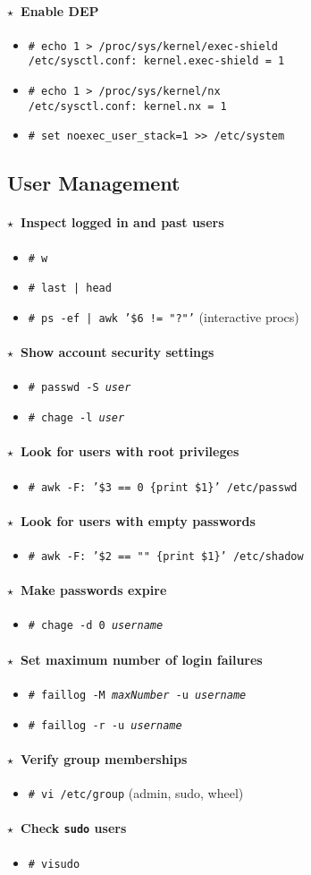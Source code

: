 \documentclass[10pt,landscape]{article}
\newcommand{\os}[1]{\texttt{\footnotesize{#1}}}
\newcommand{\unix}{\os{U}}
\newcommand{\linux}{\os{L}}
\newcommand{\solaris}{\os{S}}
\newcommand{\macos}{\os{M}}
\newenvironment{action}[1]
  {\paragraph{$\star$~#1}\begin{itemize}[leftmargin=1cm]}
  {\end{itemize}}
\newcommand{\cmd}[2]{\item[#1] {\small\tt\# #2}}
\newcommand{\comment}[1]{\textrm{\small(#1)}}
\begin{document}
\begin{multicols*}{3}
\begin{action}{Enable DEP}
\cmd{\linux}{echo 1 > /proc/sys/kernel/exec-shield\\
             /etc/sysctl.conf: kernel.exec-shield = 1}
\cmd{\macos}{echo 1 > /proc/sys/kernel/nx\\
             /etc/sysctl.conf: kernel.nx = 1}
\cmd{\solaris}{set noexec\_user\_stack=1 {>}> /etc/system}
\end{action}

\subsection*{User Management}

\begin{action}{Inspect logged in and past users}
\cmd{\unix}{w}
\cmd{\unix}{last | head}
\cmd{\unix}{ps -ef | awk '\$6 != "?"'} (interactive procs)
\end{action}

\begin{action}{Show account security settings}
\cmd{\unix}{passwd -S \emph{user}}
\cmd{\linux}{chage -l \emph{user}}
\end{action}

\begin{action}{Look for users with root privileges}
\cmd{\unix}{awk -F: '\$3 == 0 \{print \$1\}' /etc/passwd}
\end{action}

\begin{action}{Look for users with empty passwords}
\cmd{\unix}{awk -F: '\$2 == "" \{print \$1\}' /etc/shadow}
\end{action}

\begin{action}{Make passwords expire}
\cmd{\linux}{chage -d 0 \emph{username}}
\end{action}

\begin{action}{Set maximum number of login failures}
\cmd{\linux}{faillog -M \emph{maxNumber} -u \emph{username}}
\cmd{\linux}{faillog -r -u \emph{username}}
\end{action}

\begin{action}{Verify group memberships}
\cmd{\unix}{vi /etc/group} \comment{admin, sudo, wheel}
\end{action}

\begin{action}{Check \texttt{sudo} users}
\cmd{\unix}{visudo}
\end{action}


\end{multicols*}
\end{document}
